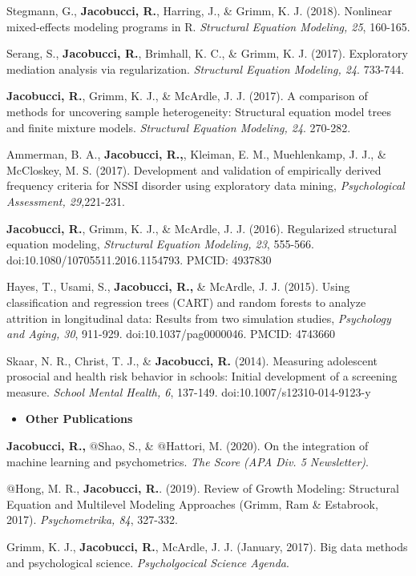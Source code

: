 \documentclass[letterpaper,10pt]{article}
\begin{document}
\begin{etaremune}
	\item Stegmann, G., \textbf{Jacobucci, R.}, Harring, J., \& Grimm, K. J. (2018). Nonlinear mixed-effects modeling programs in R. \emph{Structural Equation Modeling, 25}, 160-165.
	\item Serang, S., \textbf{Jacobucci, R.}, Brimhall, K. C., \& Grimm, K. J. (2017). Exploratory mediation analysis via regularization. \emph{Structural Equation Modeling, 24}. 733-744.
	\item \textbf{Jacobucci, R.}, Grimm, K. J., \& McArdle, J. J. (2017). A comparison of methods for uncovering sample heterogeneity: Structural equation model trees and finite mixture models. \emph{Structural Equation Modeling, 24}. 270-282.
	\item Ammerman, B. A., \textbf{Jacobucci, R.,}, Kleiman, E. M., Muehlenkamp, J. J., \& McCloskey, M. S. (2017). Development and validation of empirically derived frequency criteria for NSSI disorder using exploratory data mining, \emph{Psychological Assessment, 29,}221-231.
	\item \textbf{Jacobucci, R.}, Grimm, K. J., \& McArdle, J. J. (2016). Regularized structural equation modeling, \emph{Structural Equation Modeling, 23}, 555-566. doi:10.1080/10705511.2016.1154793. PMCID: 4937830
	\item Hayes, T., Usami, S., \textbf{Jacobucci, R.,} \& McArdle, J. J. (2015). Using classification and regression trees (CART) and random forests to analyze attrition in longitudinal data: Results from two simulation studies, \emph{Psychology and Aging, 30}, 911-929. doi:10.1037/pag0000046. PMCID: 4743660
	\item Skaar, N. R., Christ, T. J., \& \textbf{Jacobucci, R.} (2014). Measuring adolescent prosocial and health risk behavior in schools: Initial development of a screening measure. \emph{School Mental Health, 6}, 137-149. doi:10.1007/s12310-014-9123-y
	
\end{etaremune}
%
\vspace{3mm}
\begin{itemize}
	\item {\textbf{\large{Other Publications}}}
\end{itemize}
\begin{etaremune}
	\item  \textbf{Jacobucci, R.,} $@$Shao, S., \& $@$Hattori, M. (2020). On the integration of machine learning and psychometrics. \emph{The Score (APA Div. 5 Newsletter)}.
	\item  $@$Hong, M. R., \textbf{Jacobucci, R.}. (2019). Review of Growth Modeling: Structural Equation and Multilevel Modeling Approaches (Grimm, Ram \& Estabrook, 2017). \emph{Psychometrika, 84}, 327-332.
	\item Grimm, K. J., \textbf{Jacobucci, R.}, McArdle, J. J. (January, 2017). Big data methods and psychological science. \emph{Psycholgocical Science Agenda}.
	
\end{etaremune}
\end{document}
